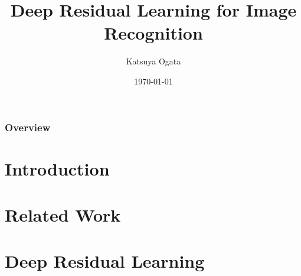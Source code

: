 \documentclass[
	11pt, %
]{beamer}
\title[ResNet]{Deep Residual Learning for Image Recognition} %
\author[Katsuya Ogata]{Katsuya Ogata} %
\institute[Osaka Univ.]{} %
\date[\today]{\today} %
\begin{document}

\begin{frame}
	\titlepage %
\end{frame}



\begin{frame}
	\frametitle{Overview} %
	
	\tableofcontents %
\end{frame}

\section{Introduction}

\section{Related Work}

\section{Deep Residual Learning}
\end{document}
